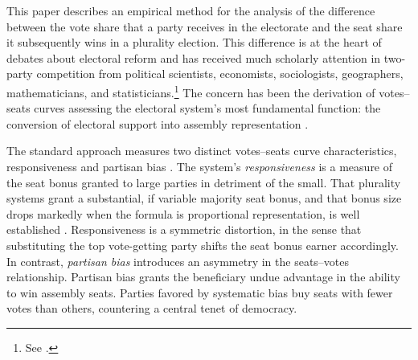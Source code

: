 \documentclass[letter,12pt]{article}
\begin{document}
 



\onehalfspacing

\noindent This paper describes an empirical method for the analysis of the difference between the vote share that a party receives in the electorate and the seat share it subsequently wins in a plurality election. This difference is at the heart of debates about electoral reform and has received much scholarly attention in two-party competition from political scientists, economists, sociologists, geographers, mathematicians, and statisticians.\footnote{See \citet{altman.mcdonald2011bard,balinskiYoung2001FairRep,brady.grofmanBiasResponsiveness1991,cain.partisanRedistricting.1985,cox.katz.2002,dahl.1956prefDemoc,engstrom2006redisttrictApsr,erikson1972malapportionment,gelman.king.1994EvalElSysRedis,grofmanBiasProportionality.1983,grofman.etalBiasMalapp.1997,gudgin.taylor.1980decomposeBias,johnston.2002,kendall.stuartCubeLaw1950,king.browning1987biasRespUS,niemi.fett1986swing,rae.1967,rossiter.etal.1997,taagepera.CubeLaw.1973,trelles.mtz.polygob2012,tufte1973seatsVotes}.\label{fn:cites}} The concern has been the derivation of votes--seats curves assessing the electoral system's most fundamental function: the conversion of electoral support into assembly representation \citep{lijphartElSysPtySys.1994}. 

The standard approach measures two distinct votes--seats curve characteristics, responsiveness and partisan bias \citep{tufte1973seatsVotes,king.browning1987biasRespUS}. The system's \emph{responsiveness} is a measure of the seat bonus granted to large parties in detriment of the small. That plurality systems grant a substantial, if variable majority seat bonus, and that bonus size drops markedly when the formula is proportional representation, is well established \citep{taagepera.shugart.1989,linzerSeatVoteElasticity2012}. Responsiveness is a symmetric distortion, in the sense that substituting the top vote-getting party shifts the seat bonus earner accordingly. In contrast, \emph{partisan bias} introduces an asymmetry in the seats--votes relationship. Partisan bias grants the beneficiary undue advantage in the ability to win assembly seats. Parties favored by systematic bias buy seats with fewer votes than others, countering a central tenet of democracy. 
\end{document}
